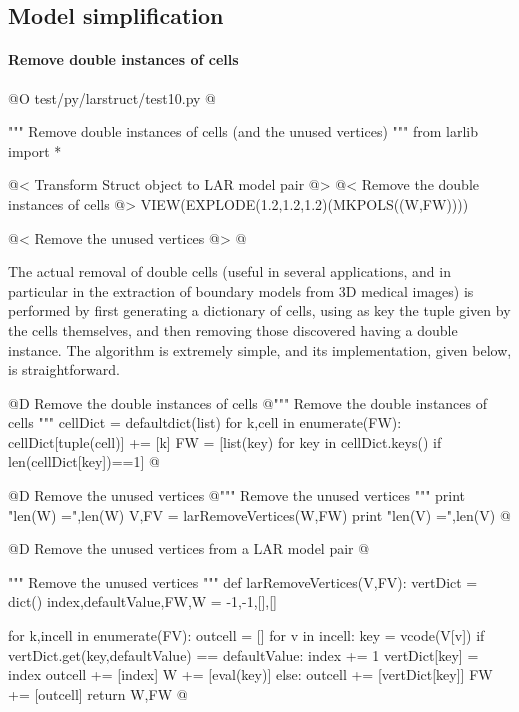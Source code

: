\documentclass[11pt,oneside]{article}    %
\begin{document}
\subsection{Model simplification}

\paragraph{Remove double instances of cells}

@O test/py/larstruct/test10.py
@{""" Remove double instances of cells (and the unused vertices) """
from larlib import *

@< Transform Struct object to LAR model pair @>
@< Remove the double instances of cells @>
VIEW(EXPLODE(1.2,1.2,1.2)(MKPOLS((W,FW))))

@< Remove the unused vertices @>
@}

The actual removal of double cells (useful in several applications, and in particular in the extraction of boundary models from 3D medical images) is performed by first generating a dictionary of cells, using as key the tuple given by the cells themselves, and then removing those discovered having a double instance.
The algorithm is extremely simple, and its implementation, given below, is straightforward.

@D Remove the double instances of cells
@{""" Remove the double instances of cells """
cellDict = defaultdict(list)
for k,cell in enumerate(FW):
    cellDict[tuple(cell)] += [k]
FW = [list(key) for key in cellDict.keys() if len(cellDict[key])==1]
@}

@D Remove the unused vertices
@{""" Remove the unused vertices """
print "len(W) =",len(W)
V,FV = larRemoveVertices(W,FW)
print "len(V) =",len(V)
@}

@D Remove the unused vertices from a LAR model pair
@{""" Remove the unused vertices """
def larRemoveVertices(V,FV):
    vertDict = dict()
    index,defaultValue,FW,W = -1,-1,[],[]
        
    for k,incell in enumerate(FV):
        outcell = []
        for v in incell:
            key = vcode(V[v])
            if vertDict.get(key,defaultValue) == defaultValue:
                index += 1
                vertDict[key] = index
                outcell += [index]
                W += [eval(key)]
            else: 
                outcell += [vertDict[key]]
        FW += [outcell]
    return W,FW
@}
\end{document}

